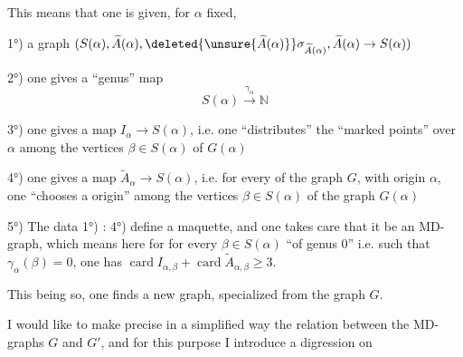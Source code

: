 This means that one is given, for $\alpha$ fixed,

1°) a  graph $(S(\alpha),\widetilde A(\alpha),\deleted{\unsure{\widetilde A(\alpha)}}\sigma_{\widetilde A(\alpha)},\widetilde A(\alpha)\to S(\alpha))$

2°) one  gives a ``genus'' map
\[
S(\alpha)\xrightarrow{\gamma_\alpha}\mathbb N
\]

3°) one gives a map $I_\alpha\to S(\alpha)$, i.e. one ``distributes'' the  ``marked points'' over $\alpha$  among the vertices $\beta\in S(\alpha)$ of $G(\alpha)$

4°) one gives a map $\widetilde A_\alpha\to S(\alpha)$, i.e. for every  of the graph $G$, with origin $\alpha$, one  ``chooses a  origin'' among the vertices $\beta\in S(\alpha)$ of the graph $G(\alpha)$

5°) The data 1°) : 4°) define a maquette,  and one takes care that it be an MD-graph,  which means here for for every $\beta\in S(\alpha)$ ``of genus 0'' i.e. such that $\gamma_\alpha(\beta)=0$, one has $\operatorname{card}I_{\alpha,\beta}+\operatorname{card}\widetilde A_{\alpha,\beta}\geq 3$.

This being so, one finds a new graph,  specialized from the graph $G$.

I would like to make precise in a simplified way the relation between the MD-graphs $G$ and $G'$, and for this purpose I introduce a digression on
